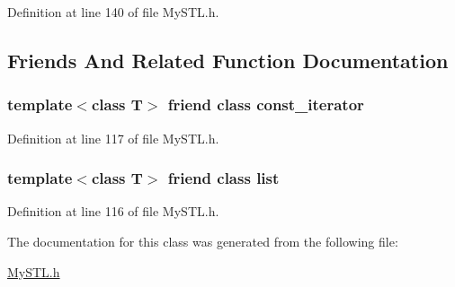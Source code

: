 Definition at line 140 of file MySTL.h.



\subsection{Friends And Related Function Documentation}
\subsubsection[{const\_\-iterator}]{\setlength{\rightskip}{0pt plus 5cm}template$<$class T$>$ friend class {\bf const\_\-iterator}}\label{classlist_1_1iterator_ac220ce1c155db1ac44146c12d178056f}


Definition at line 117 of file MySTL.h.

\subsubsection[{list}]{\setlength{\rightskip}{0pt plus 5cm}template$<$class T$>$ friend class {\bf list}}\label{classlist_1_1iterator_a39e8296e3b93358d0af90000b5d9113c}


Definition at line 116 of file MySTL.h.



The documentation for this class was generated from the following file:\begin{DoxyCompactItemize}
\item 
\hyperlink{MySTL_8h}{MySTL.h}\end{DoxyCompactItemize}
